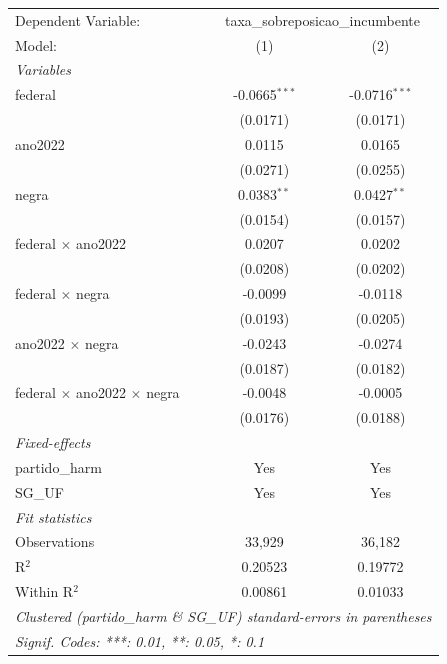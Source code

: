 
\begingroup
\centering
\begin{tabular}{lcc}
   \tabularnewline \midrule \midrule
   Dependent Variable: & \multicolumn{2}{c}{taxa\_sobreposicao\_incumbente}\\
   Model:                                    & (1)             & (2)\\  
   \midrule
   \emph{Variables}\\
   federal                                   & -0.0665$^{***}$ & -0.0716$^{***}$\\   
                                             & (0.0171)        & (0.0171)\\   
   ano2022                                   & 0.0115          & 0.0165\\   
                                             & (0.0271)        & (0.0255)\\   
   negra                                     & 0.0383$^{**}$   & 0.0427$^{**}$\\   
                                             & (0.0154)        & (0.0157)\\   
   federal $\times$ ano2022                  & 0.0207          & 0.0202\\   
                                             & (0.0208)        & (0.0202)\\   
   federal $\times$ negra                    & -0.0099         & -0.0118\\   
                                             & (0.0193)        & (0.0205)\\   
   ano2022 $\times$ negra                    & -0.0243         & -0.0274\\   
                                             & (0.0187)        & (0.0182)\\   
   federal $\times$ ano2022 $\times$ negra   & -0.0048         & -0.0005\\   
                                             & (0.0176)        & (0.0188)\\   
   \midrule
   \emph{Fixed-effects}\\
   partido\_harm                             & Yes             & Yes\\  
   SG\_UF                                    & Yes             & Yes\\  
   \midrule
   \emph{Fit statistics}\\
   Observations                              & 33,929          & 36,182\\  
   R$^2$                                     & 0.20523         & 0.19772\\  
   Within R$^2$                              & 0.00861         & 0.01033\\  
   \midrule \midrule
   \multicolumn{3}{l}{\emph{Clustered (partido\_harm \& SG\_UF) standard-errors in parentheses}}\\
   \multicolumn{3}{l}{\emph{Signif. Codes: ***: 0.01, **: 0.05, *: 0.1}}\\
\end{tabular}
\par\endgroup


